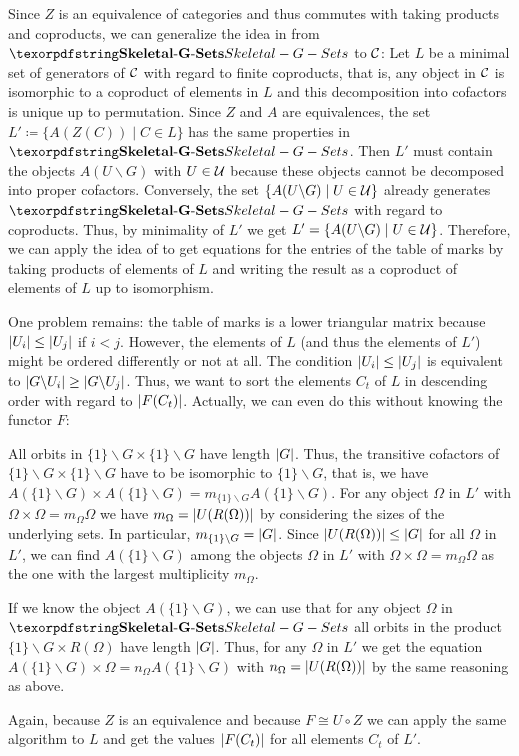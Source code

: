 \begin{rem}
Since $Z$ is an equivalence of categories and thus commutes with taking products and coproducts, we can generalize the idea in  from $\SkeletalGSets$ to $\mathcal{C}$: Let $L$ be a minimal set of generators of $\mathcal{C}$ with regard to finite coproducts, that is, any object in $\mathcal{C}$ is isomorphic to a coproduct of elements in $L$ and this decomposition into cofactors is unique up to permutation. Since $Z$ and $A$ are equivalences, the set $L' \coloneqq \{A(Z(C)) \mid C \in L\}$ has the same properties in $\SkeletalGSets$. Then $L'$ must contain the objects $A(U \backslash G)$ with $U \in \mathcal{U}$ because these objects cannot be decomposed into proper cofactors. Conversely, the set $\{A(U \backslash G) \mid U \in \mathcal{U}\}$ already generates $\SkeletalGSets$ with regard to coproducts. Thus, by minimality of $L'$ we get $L' = \{A(U \backslash G) \mid U \in \mathcal{U}\}$. Therefore, we can apply the idea of  to get equations for the entries of the table of marks by taking products of elements of $L$ and writing the result as a coproduct of elements of $L$ up to isomorphism.

One problem remains: the table of marks is a lower triangular matrix because ${\lvert U_i\rvert} \leq {\lvert U_j\rvert}$ if $i < j$. However, the elements of $L$ (and thus the elements of $L'$) might be ordered differently or not at all. The condition ${\lvert U_i\rvert} \leq {\lvert U_j\rvert}$ is equivalent to ${\lvert G \backslash U_i\rvert} \geq {\lvert G \backslash U_j\rvert}$. Thus, we want to sort the elements $C_t$ of $L$ in descending order with regard to ${\lvert F(C_t)\rvert}$. Actually, we can even do this without knowing the functor $F$:

All orbits in $\{1\} \backslash G \times \{1\} \backslash G$ have length ${\lvert G\rvert}$. Thus, the transitive cofactors of $\{1\} \backslash G \times \{1\} \backslash G$ have to be isomorphic to $\{1\} \backslash G$, that is, we have $A(\{1\} \backslash G) \times A(\{1\} \backslash G) = m_{\{1\} \backslash G} A(\{1\} \backslash G)$. For any object $\Omega$ in $L'$ with $\Omega \times \Omega = m_{\Omega} \Omega$ we have $m_{\Omega} = {\lvert U(R(\Omega))\rvert}$ by considering the sizes of the underlying sets. In particular, $m_{\{1\} \backslash G} = {\lvert G\rvert}$. Since ${\lvert U(R(\Omega))\rvert} \leq {\lvert G\rvert}$ for all $\Omega$ in $L'$, we can find $A(\{1\} \backslash G)$ among the objects $\Omega$ in $L'$ with $\Omega \times \Omega = m_{\Omega} \Omega$ as the one with the largest multiplicity $m_\Omega$.

If we know the object $A(\{1\} \backslash G)$, we can use that for any object $\Omega$ in $\SkeletalGSets$ all orbits in the product $\{1\} \backslash G \times R(\Omega)$ have length ${\lvert G\rvert}$. Thus, for any $\Omega$ in $L'$ we get the equation $A(\{1\} \backslash G) \times \Omega = n_\Omega A(\{1\} \backslash G)$ with $n_\Omega = {\lvert U(R(\Omega))\rvert}$ by the same reasoning as above.

Again, because $Z$ is an equivalence and because $F \cong U \circ Z$ we can apply the same algorithm to $L$ and get the values ${\lvert F(C_t)\rvert}$ for all elements $C_t$ of $L'$.
\end{rem}

